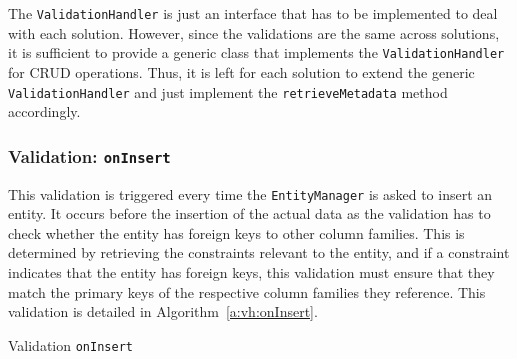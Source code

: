 		
		
		The \texttt{ValidationHandler} is just an interface that has to be implemented
		to deal with each solution. However, since the validations are the same across
		solutions, it is sufficient to provide a generic
		class that implements the \texttt{ValidationHandler} for \ac{CRUD} operations.
		Thus, it is left for each solution to extend the generic
		\texttt{ValidationHandler} and just implement the \texttt{retrieveMetadata}
		method accordingly.
		
		
		
		
	
	\subsubsection{Validation: \texttt{onInsert}}
		This validation is triggered every time the \texttt{EntityManager} is asked to
		insert an entity. It occurs before the insertion of the actual data as the
		validation has to check whether the entity has foreign keys to other column
		families. This is determined by retrieving the  constraints relevant to the
		entity, and if a constraint indicates that the entity has foreign keys,
		this validation must ensure that they match the primary keys of the
		respective column families they reference. This validation is detailed in
		Algorithm~\ref{a:vh:onInsert}.
	
	 	\begin{algorithm}[H]
	 		\caption{Validation \texttt{onInsert}}\label{a:vh:onInsert}
	 		\small
	 	\end{algorithm}
	 	
